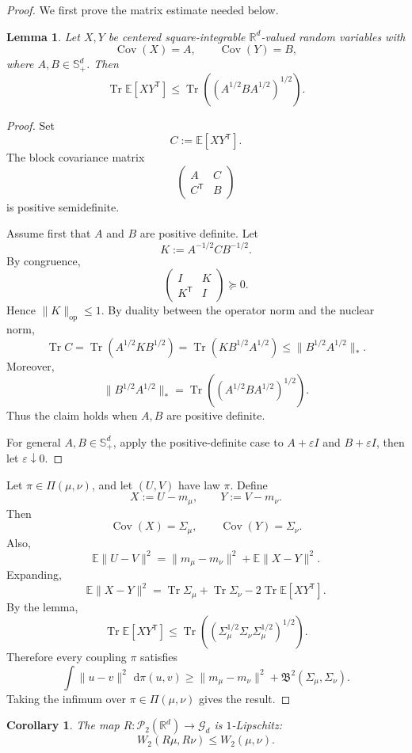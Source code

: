 \documentclass[11pt]{article}
\newtheorem{lemma}{Lemma}
\newtheorem{corollary}{Corollary}
\DeclareMathOperator{\Tr}{Tr}
\DeclareMathOperator{\Cov}{Cov}
\newcommand{\R}{\mathbb R}
\newcommand{\W}{W}
\newcommand{\dd}{\,\mathrm d}
\begin{document}
\begin{proof}
We first prove the matrix estimate needed below.

\begin{lemma}
Let $X,Y$ be centered square-integrable $\R^d$-valued random variables with
\[
\Cov(X)=A,
\qquad
\Cov(Y)=B,
\]
where $A,B\in\mathbb S_+^d$. Then
\[
\Tr \mathbb E[XY^{\mathsf T}]
\le
\Tr\!\left((A^{1/2}BA^{1/2})^{1/2}\right).
\]
\end{lemma}

\begin{proof}
Set
\[
C:=\mathbb E[XY^{\mathsf T}].
\]
The block covariance matrix
\[
\begin{pmatrix}
A & C\\
C^{\mathsf T} & B
\end{pmatrix}
\]
is positive semidefinite.

Assume first that $A$ and $B$ are positive definite. Let
\[
K:=A^{-1/2}CB^{-1/2}.
\]
By congruence,
\[
\begin{pmatrix}
I & K\\
K^{\mathsf T} & I
\end{pmatrix}\succeq 0.
\]
Hence $\|K\|_{\mathrm{op}}\le 1$. By duality between the operator norm and the nuclear norm,
\[
\Tr C
=
\Tr(A^{1/2}KB^{1/2})
=
\Tr(KB^{1/2}A^{1/2})
\le
\|B^{1/2}A^{1/2}\|_*.
\]
Moreover,
\[
\|B^{1/2}A^{1/2}\|_*
=
\Tr\!\left((A^{1/2}BA^{1/2})^{1/2}\right).
\]
Thus the claim holds when $A,B$ are positive definite.

For general $A,B\in\mathbb S_+^d$, apply the positive-definite case to $A+\varepsilon I$ and $B+\varepsilon I$, then let $\varepsilon\downarrow 0$.
\end{proof}

Let $\pi\in\Pi(\mu,\nu)$, and let $(U,V)$ have law $\pi$. Define
\[
X:=U-m_\mu,
\qquad
Y:=V-m_\nu.
\]
Then
\[
\Cov(X)=\Sigma_\mu,
\qquad
\Cov(Y)=\Sigma_\nu.
\]
Also,
\[
\mathbb E\|U-V\|^2
=
\|m_\mu-m_\nu\|^2+\mathbb E\|X-Y\|^2.
\]
Expanding,
\[
\mathbb E\|X-Y\|^2
=
\Tr\Sigma_\mu+\Tr\Sigma_\nu
-
2\Tr\mathbb E[XY^{\mathsf T}].
\]
By the lemma,
\[
\Tr\mathbb E[XY^{\mathsf T}]
\le
\Tr\!\left((\Sigma_\mu^{1/2}\Sigma_\nu\Sigma_\mu^{1/2})^{1/2}\right).
\]
Therefore every coupling $\pi$ satisfies
\[
\int\|u-v\|^2\,\dd\pi(u,v)
\ge
\|m_\mu-m_\nu\|^2+\mathfrak B^2(\Sigma_\mu,\Sigma_\nu).
\]
Taking the infimum over $\pi\in\Pi(\mu,\nu)$ gives the result.
\end{proof}

\begin{corollary}
The map $R:\mathcal P_2(\R^d)\to\mathcal G_d$ is $1$-Lipschitz:
\[
\W_2(R\mu,R\nu)\le \W_2(\mu,\nu).
\]
\end{corollary}
\end{document}
